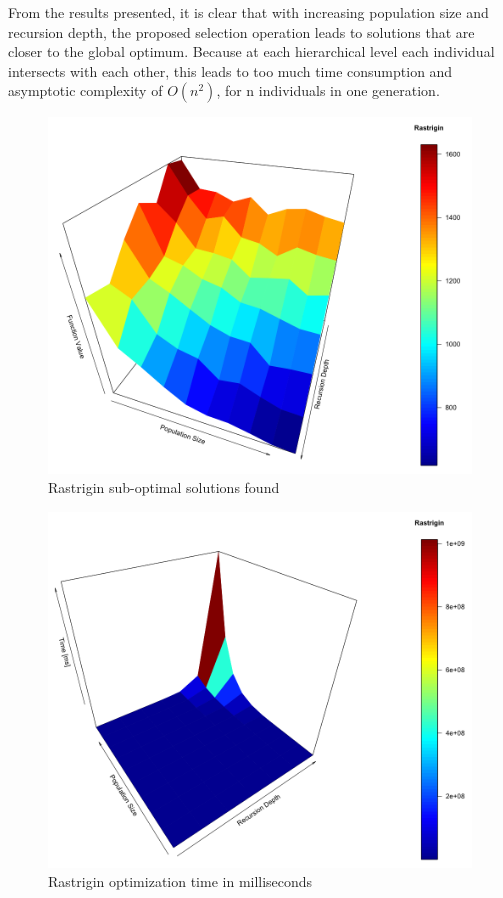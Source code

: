 \documentclass[graybox]{styles/svmult}
\begin{document}
From the results presented, it is clear that with increasing population size and recursion depth, the proposed selection operation leads to solutions that are closer to the global optimum. Because at each hierarchical level each individual intersects with each other, this leads to too much time consumption and asymptotic complexity of $O(n^2)$, for n individuals in one generation.

\begin{figure}[b]
\sidecaption
\includegraphics[width=1.0\textwidth,height=0.45\textheight]{images/fig03}
\caption{Rastrigin sub-optimal solutions found}
\label{fig:10}
\end{figure}

\begin{figure}[b]
\sidecaption
\includegraphics[width=1.0\textwidth,height=0.45\textheight]{images/fig04}
\caption{Rastrigin optimization time in milliseconds}
\label{fig:11}
\end{figure}
\end{document}
